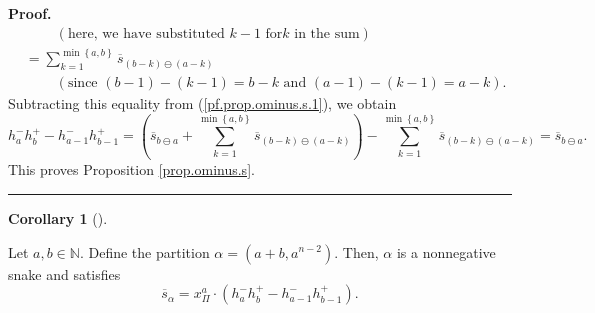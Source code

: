 \documentclass[numbers=enddot,12pt,final,onecolumn,notitlepage]{scrartcl}%
\theoremstyle{definition}
\newtheorem{coro}[theo]{Corollary}
\newenvironment{corollary}[1][]
{\begin{coro}[#1]\begin{leftbar}}
{\end{leftbar}\end{coro}}
\newenvironment{proof}[1][Proof]{\noindent\textbf{#1.} }{\ \rule{0.5em}{0.5em}}
\let\sumnonlimits\sum
\renewcommand{\sum}{\sumnonlimits\limits}
\begin{document}
\begin{proof}
\begin{align*}
&  \ \ \ \ \ \ \ \ \ \ \left(  \text{here, we have substituted }k-1\text{ for
}k\text{ in the sum}\right) \\
&  =\sum_{k=1}^{\min\left\{  a,b\right\}  }\overline{s}_{\left(  b-k\right)
\ominus\left(  a-k\right)  }\\
&  \ \ \ \ \ \ \ \ \ \ \left(  \text{since }\left(  b-1\right)  -\left(
k-1\right)  =b-k\text{ and }\left(  a-1\right)  -\left(  k-1\right)
=a-k\right)  .
\end{align*}
Subtracting this equality from (\ref{pf.prop.ominus.s.1}), we obtain%
\[
h_{a}^{-}h_{b}^{+}-h_{a-1}^{-}h_{b-1}^{+}=\left(  \overline{s}_{b\ominus
a}+\sum_{k=1}^{\min\left\{  a,b\right\}  }\overline{s}_{\left(  b-k\right)
\ominus\left(  a-k\right)  }\right)  -\sum_{k=1}^{\min\left\{  a,b\right\}
}\overline{s}_{\left(  b-k\right)  \ominus\left(  a-k\right)  }=\overline
{s}_{b\ominus a}.
\]
This proves Proposition \ref{prop.ominus.s}.
\end{proof}

\begin{corollary}
\label{cor.ominus.salpha}Let $a,b\in\mathbb{N}$. Define the partition
$\alpha=\left(  a+b,a^{n-2}\right)  $. Then, $\alpha$ is a nonnegative snake
and satisfies
\[
\overline{s}_{\alpha}=x_{\Pi}^{a}\cdot\left(  h_{a}^{-}h_{b}^{+}-h_{a-1}%
^{-}h_{b-1}^{+}\right)  .
\]

\end{corollary}
\end{document}
